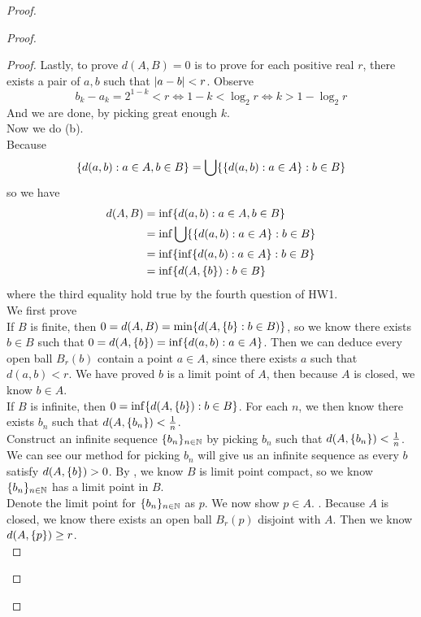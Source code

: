 \documentclass{report}
\begin{document}
\begin{proof}
\begin{proof}
\begin{proof}
Lastly, to prove $d(A,B)=0$ is to prove for each positive real $r$, there exists a pair of $a,b$ such that  $|a-b|<r$. Observe
 \begin{equation}
b_k-a_k=2^{1-k}<r\iff 1-k<\log_2 r\iff k>1-\log_2 r
\end{equation}
And we are done, by picking great enough $k$.\\



Now we do (b).\\

Because 
\begin{equation}
\{ d(a,b):a\in A,b\in B \}=\bigcup \{ \{ d(a,b):a\in A \}:b \in B \}
\end{equation}
so we have 
\begin{align}
d(A,B)&=\inf \{ d(a,b):a\in A,b\in B \}\\
&=\inf \bigcup \{ \{ d(a,b):a\in A \}:b\in B \}\\
&=\inf \{ \inf \{ d(a,b):a\in A \}:b\in B \}\\
&=\inf \{ d(A,\{ b \}):b \in B \}
\end{align}
where the third equality hold true by the fourth question of HW1.\\


We first prove \\

If $B$ is finite, then  $0=d(A,B)=\min \{ d(A,\{ b \}:b\in B) \}$, so we know there exists $b\in B$ such that $0=d(A,\{ b \})=\inf \{ d(a,b):a\in A \}$. Then we can deduce every open ball $B_r(b)$ contain a point $a\in A$, since there exists $a$ such that  $d(a,b)<r$. We have proved $b$ is a limit point of $A$, then because  $A$ is closed, we know  $b\in A$.\\

If $B$ is infinite, then  $0=\inf \{ d(A,\{ b \}):b\in B \}$. For each $n$, we then know there exists  $b_n$ such that  $d(A,\{ b_n \})<\frac{1}{n}$.\\


Construct an infinite sequence $\{ b_n \}_{n\in\mathbb{N}}$ by picking $b_n$ such that $d(A,\{ b_n \})<\frac{1}{n}$. We can see our method for picking $b_n$ will give us an infinite sequence as every $b$  satisfy  $d(A,\{ b \})>0$. By , we know $B$ is limit point compact, so we know $\{ b_n \}_{n\in\mathbb{N}}$ has a limit point in $B$.\\

Denote the limit point for $\{ b_n \}_{n\in\mathbb{N}}$ as $p$. We now show $p\in A$. . Because $A$ is closed, we know there exists an open ball  $B_r(p)$ disjoint with $A$. Then we know $d(A,\{ p \})\geq r$. \\


\end{proof}
\end{proof}
\end{proof}
\end{document}
